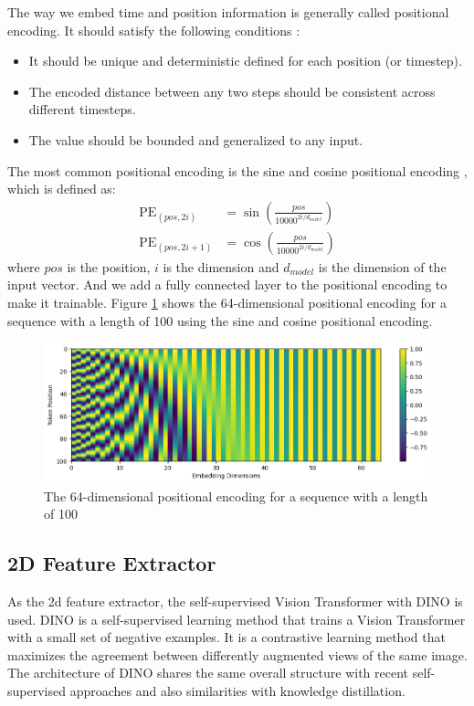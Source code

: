 \documentclass[12pt,DIV14,BCOR12mm,a4paper,footinclude=false,headinclude,parskip=half-,twoside,openright,cleardoublepage=empty,toc=index,bibliography=totoc,listof=totoc]{scrreprt}
\numberwithin{equation}{chapter}
\begin{document}
The way we embed time and position information is generally called positional encoding. It should satisfy the following conditions \cite{kazemnejad2019:pencoding}:
\begin{itemize}
  \item It should be unique and deterministic defined for each position (or timestep).
  \item The encoded distance between any two steps should be consistent across different timesteps.
  \item The value should be bounded and generalized to any input.
\end{itemize}
The most common positional encoding is the sine and cosine positional encoding \cite{vaswani2023attention}, which is defined as:
\begin{align}
  \text{PE}_{(pos, 2i)} &= \sin\left(\frac{pos}{10000^{2i/d_{model}}}\right)\\
  \text{PE}_{(pos, 2i+1)} &= \cos\left(\frac{pos}{10000^{2i/d_{model}}}\right)
\end{align}
where $pos$ is the position, $i$ is the dimension and $d_{model}$ is the dimension of the input vector. And we add a fully connected layer to the positional encoding to make it trainable. Figure \ref{img:pe} shows the 64-dimensional positional encoding for a sequence with a length of 100 using the sine and cosine positional encoding.
\begin{figure}[h]
	\centering
	\includegraphics[width=1.0\textwidth]{img/pe.png}
	\caption{The 64-dimensional positional encoding for a sequence with a length of 100}
	\label{img:pe}
\end{figure}

\subsection{2D Feature Extractor}
As the \gls{2d} feature extractor, the self-supervised Vision Transformer
 with DINO \cite{caron2021emerging} is used. DINO is a self-supervised learning method that trains a Vision Transformer
 with a small set of negative examples. It is a contrastive learning method that maximizes the agreement between differently augmented views of the same image. The architecture of DINO shares the same overall structure with recent self-supervised approaches and also similarities with knowledge distillation.
\end{document}
